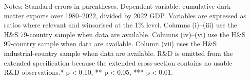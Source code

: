 \documentclass[11pt]{article}
\begin{document}
\small
\setcounter{table}{2}
\renewcommand{\thetable}{E3a}
\begin{table}[htbp]
\centering
\caption{Extended Table 3a: Sources of Dark Matter, 79-Country Sample (1980--2022)}
\label{tab:E3a_extended_sources_79}
\scriptsize
{}
\begin{minipage}{0.95\linewidth}
\footnotesize Notes: Standard errors in parentheses. Dependent variable: cumulative dark matter exports over 1980--2022, divided by 2022 GDP. Variables are expressed as ratios where relevant and winsorised at the 1\% level. Columns (i)--(iii) use the H\&S 79-country sample when data are available. Columns (iv)--(vi) use the H\&S 99-country sample when data are available. Column (vii) uses the H\&S industrial-country sample when data are available. R\&D is omitted from the extended specification because the extended cross-section contains no usable R\&D observations.* p$<$0.10, ** p$<$0.05, *** p$<$0.01.
\end{minipage}
\end{table}
\end{document}
